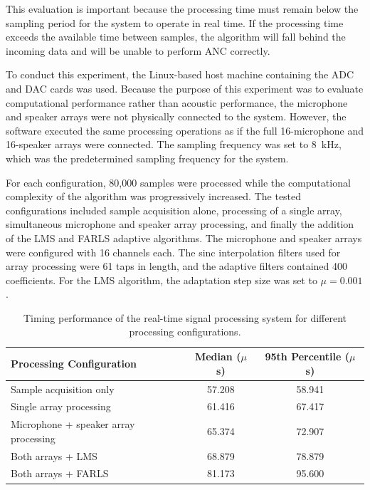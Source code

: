 This evaluation is important because the processing time must remain below the sampling period for the system to operate in real time. If the processing time exceeds the available time between samples, the algorithm will fall behind the incoming data and will be unable to perform ANC correctly.

To conduct this experiment, the Linux-based host machine containing the ADC and DAC cards was used. Because the purpose of this experiment was to evaluate computational performance rather than acoustic performance, the microphone and speaker arrays were not physically connected to the system. However, the software executed the same processing operations as if the full 16-microphone and 16-speaker arrays were connected. The sampling frequency was set to 8~kHz, which was the predetermined sampling frequency for the system.

For each configuration, 80,000 samples were processed while the computational complexity of the algorithm was progressively increased. The tested configurations included sample acquisition alone, processing of a single array, simultaneous microphone and speaker array processing, and finally the addition of the LMS and FARLS adaptive algorithms. The microphone and speaker arrays were configured with 16 channels each. The sinc interpolation filters used for array processing were 61 taps in length, and the adaptive filters contained 400 coefficients. For the LMS algorithm, the adaptation step size was set to $\mu = 0.001$.

\begin{table}[H]
\renewcommand{\arraystretch}{1.3}
\caption{Timing performance of the real-time signal processing system for different processing configurations.}
\label{table:timing_performance}

\centering
\begin{tabular}{||l|c|c||}
\hline
Processing Configuration &
Median ($\mu$s) &
95th Percentile ($\mu$s) \\ \hline

Sample acquisition only &
57.208 &
58.941 \\ \hline

Single array processing &
61.416 &
67.417 \\ \hline

Microphone + speaker array processing &
65.374 &
72.907 \\ \hline

Both arrays + LMS &
68.879 &
78.879 \\ \hline

Both arrays + FARLS &
81.173 &
95.600 \\ \hline

\end{tabular}
\end{table}

